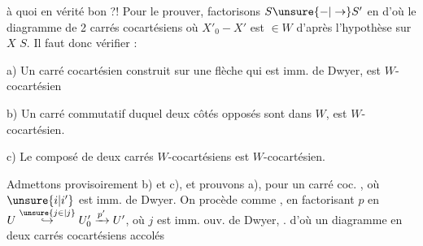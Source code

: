 
à quoi en vérité  bon ?! Pour le prouver, factorisons  $S\unsure{-|\to}S'$ en
d'où le diagramme de 2 carrés cocartésiens
où $X'_0-X'$ est $\in W$ d'après l'hypothèse sur $X$  $S$. Il faut donc vérifier :

a) Un carré cocartésien construit sur une flèche qui est imm. de Dwyer, est  $W$-cocartésien

b) Un carré commutatif  duquel deux côtés opposés sont dans $W$, est $W$-cocartésien.

c) Le composé de deux carrés $W$-cocartésiens est $W$-cocartésien.

Admettons provisoirement b) et c), et prouvons a), pour un carré coc.
, où $\unsure{i|i'}$ est imm.  de Dwyer. On procède  comme , en factorisant $p$ en $U\overset{\unsure{j\in|j}}{\hookrightarrow}U'_0\xrightarrow{p'}U'$, où $j$ est imm. ouv. de Dwyer,  . d'où un diagramme en deux carrés cocartésiens accolés


